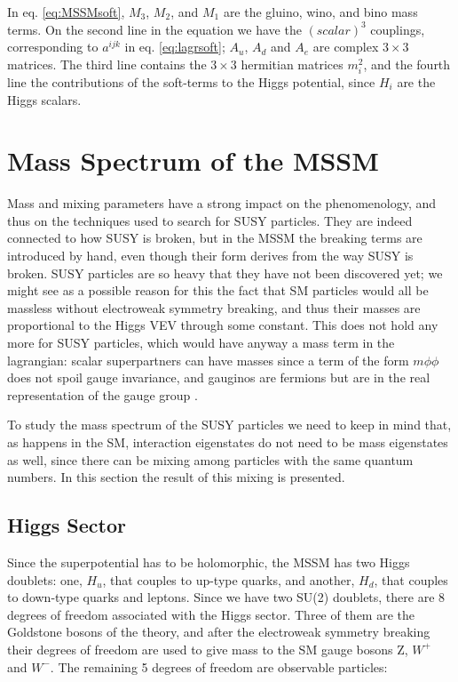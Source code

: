 In eq. \ref{eq:MSSMsoft}, $M_3$, $M_2$, and $M_1$ are the gluino, wino, and bino mass terms. On the second line in the equation we have the $(scalar)^3$ couplings, corresponding to $a^{ijk}$ in eq. \ref{eq:lagrsoft}; ${A_u}$, ${A_d}$ and ${A_e}$ are complex $3\times 3$ matrices. The third line contains the $3\times 3$ hermitian matrices $m^2_i$, and the fourth line the contributions of the soft-terms to the Higgs potential, since $H_i$ are the Higgs scalars.

\section{Mass Spectrum of the MSSM}

Mass and mixing parameters have a strong impact on the phenomenology, and thus on the techniques used to search for SUSY particles. They are indeed connected to how SUSY is broken, but in the MSSM the breaking terms are introduced by hand, even though their form derives from the way SUSY is broken. SUSY particles are so heavy that they have not been discovered yet; we might see as a possible reason for this the fact that SM particles would all be massless without electroweak symmetry breaking, and thus their masses are proportional to the Higgs VEV through some constant. This does not hold any more for SUSY particles, which would have anyway a mass term in the lagrangian: scalar superpartners can have masses since a term of the form $m\phi\phi$ does not spoil gauge invariance, and gauginos are fermions but are in the real representation of the gauge group \cite{martin:primer}.


To study the mass spectrum of the SUSY particles we need to keep in mind that, as happens in the SM, interaction eigenstates do not need to be mass eigenstates as well, since there can be mixing among particles with the same quantum numbers. In this section the result of this mixing is presented. 

\subsection{Higgs Sector}

Since the superpotential has to be holomorphic, the MSSM has two Higgs doublets: one, $H_u$, that couples to up-type quarks, and another, $H_d$, that couples to down-type quarks and leptons. Since we have two SU(2) doublets, there are 8 degrees of freedom associated with the Higgs sector. Three of them are the Goldstone bosons of the theory, and after the electroweak symmetry breaking their degrees of freedom are used to give mass to the SM gauge bosons Z, $W^+$ and $W^-$. The remaining 5 degrees of freedom are observable particles:

